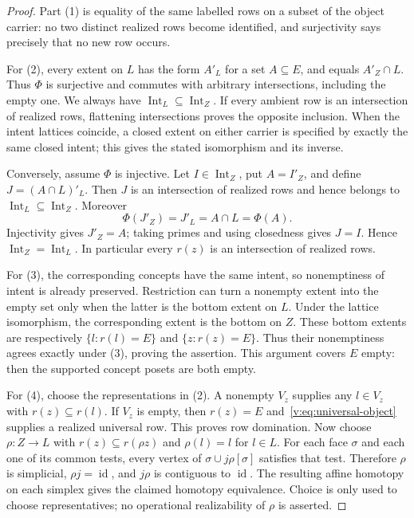 \documentclass[11pt]{article}
\theoremstyle{definition}
\theoremstyle{remark}\newtheorem{remark}[theorem]{Remark}
\newcommand{\id}{\operatorname{id}}
\newcommand{\Int}{\operatorname{Int}}
\begin{document}
\begin{proof}
Part (1) is equality of the same labelled rows on a subset of the object
carrier: no two distinct realized rows become identified, and surjectivity
says precisely that no new row occurs.

For (2), every extent on $L$ has the form $A'_L$ for a set $A\subseteq E$,
and equals $A'_Z\cap L$. Thus $\Phi$ is surjective and commutes with
arbitrary intersections, including the empty one. We always have
$\Int_L\subseteq\Int_Z$. If every ambient row is an intersection of
realized rows, flattening intersections proves the opposite inclusion.
When the intent lattices coincide, a closed extent on either carrier is
specified by exactly the same closed intent; this gives the stated
isomorphism and its inverse.

Conversely, assume $\Phi$ is injective. Let $I\in\Int_Z$, put
$A=I'_Z$, and define $J=(A\cap L)'_L$. Then $J$ is an intersection of
realized rows and hence belongs to $\Int_L\subseteq\Int_Z$.
Moreover
\[
 \Phi(J'_Z)=J'_L=A\cap L=\Phi(A).
\]
Injectivity gives $J'_Z=A$; taking primes and using closedness gives
$J=I$. Hence $\Int_Z=\Int_L$. In particular every $r(z)$ is an
intersection of realized rows.

For (3), the corresponding concepts have the same intent, so nonemptiness
of intent is already preserved. Restriction can turn a nonempty extent
into the empty set only when the latter is the bottom extent on $L$.
Under the lattice isomorphism, the corresponding extent is the bottom
on $Z$. These bottom extents are respectively
$\{l:r(l)=E\}$ and $\{z:r(z)=E\}$. Thus their nonemptiness agrees
exactly under (3), proving the assertion. This argument covers $E$ empty:
then the supported concept posets are both empty.

For (4), choose the representations in (2). A nonempty $V_z$ supplies
any $l\in V_z$ with $r(z)\subseteq r(l)$. If $V_z$ is empty, then
$r(z)=E$ and~\eqref{v:eq:universal-object} supplies a realized universal row. This proves
row domination. Now choose $\rho:Z\to L$ with
$r(z)\subseteq r(\rho z)$ and $\rho(l)=l$ for $l\in L$.
For each face $\sigma$ and each one of its common tests, every vertex of
$\sigma\cup j\rho[\sigma]$ satisfies that test. Therefore $\rho$ is
simplicial, $\rho j=\id$, and $j\rho$ is contiguous to $\id$.
The resulting affine homotopy on each simplex gives the claimed homotopy
equivalence. Choice is only used to choose representatives; no operational
realizability of $\rho$ is asserted.
\end{proof}
\end{document}
